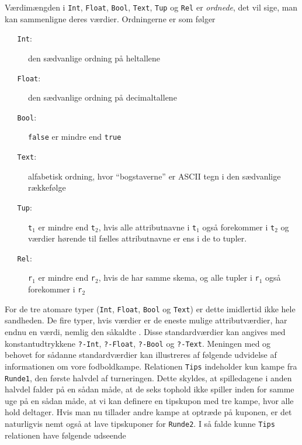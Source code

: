 V\ae{}rdim\ae{}ngden i \verb"Int", \verb"Float", \verb"Bool", \verb"Text", \verb"Tup" og
\verb"Rel" er {\em ordnede}, det vil sige, man kan sammenligne deres
v\ae{}rdier. Ordningerne er som f\o{}lger
\begin{description}%
\item[{\tt ~~~Int}:] den s\ae{}dvanlige ordning p\aa{} heltallene
\item[{\tt ~~~Float}:] den s\ae{}dvanlige ordning p\aa{} decimaltallene
\item[{\tt ~~~Bool}:] \verb"false" er mindre end \verb"true"
\item[{\tt ~~~Text}:] alfabetisk ordning, hvor ``bogstaverne'' er ASCII tegn
i den s\ae{}dvanlige r\ae{}kkef\o{}lge
\item[{\tt ~~~Tup}:] {\tt t$_1$} er mindre end {\tt t$_2$}, hvis alle attributnavne
i {\tt t$_1$} ogs\aa{} forekommer i {\tt t$_2$} og v\ae{}rdier h\o{}rende
til f\ae{}lles attributnavne er ens i de to tupler. 
\item[{\tt ~~~Rel}:] {\tt r$_1$} er mindre end {\tt r$_2$}, hvis 
de har samme skema, og alle tupler i {\tt r$_1$} ogs\aa{} 
forekommer i {\tt r$_2$}
\end{description}
For de tre atomare typer (\verb"Int", \verb"Float", \verb"Bool" og \verb"Text")
er dette imidlertid ikke hele sandheden. De fire typer, hvis
v\ae{}rdier er de eneste mulige attributv\ae{}rdier, har endnu en v\ae{}rdi,
nemlig den s\aa{}kaldte {\em {}}. Disse 
standardv\ae{}rdier kan angives
med konstantudtrykkene \verb"?-Int", \verb"?-Float", \verb"?-Bool" og \verb"?-Text".
Meningen med og behovet for s\aa{}danne standardv\ae{}rdier kan
illustreres af f\o{}lgende udvidelse af informationen om vore
fodboldkampe. Relationen
\verb"Tips" indeholder kun kampe fra \verb"Runde1", den f\o{}rste halvdel af 
turneringen. Dette skyldes, at spilledagene i anden halvdel falder
p\aa{} en s\aa{}dan m\aa{}de, at de seks tophold ikke spiller
inden for samme uge p\aa{} en s\aa{}dan m\aa{}de, at vi kan
definere en tipskupon med tre kampe, hvor alle hold deltager.
Hvis man nu tillader andre kampe at optr\ae{}de p\aa{} kuponen, er det
naturligvis nemt ogs\aa{} at lave tipskuponer for \verb"Runde2".
I s\aa{} falde kunne \verb"Tips" relationen have f\o{}lgende udseende
\begin{center}
\end{center}
